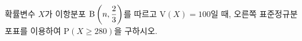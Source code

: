 \noindent\begin{minipage}[t]{0.58\linewidth}\vspace{0pt}\raggedright 확률변수 $X$가 이항분포 $\mathrm{B}\left(n{,}\mkern3mu\mathopen{}\dfrac{2}{3}\right)$를 따르고 $\mathrm{V}(X)=100$일 때, 오른쪽 표준정규분포표를 이용하여 $\mathrm{P}(X\ge 280)$을 구하시오.\end{minipage}\hfill\begin{minipage}[t]{0.4\linewidth}\vspace{0pt}\centering \resizebox{\ifdim\width>\linewidth\linewidth\else\width\fi}{!}{}\end{minipage}\par
